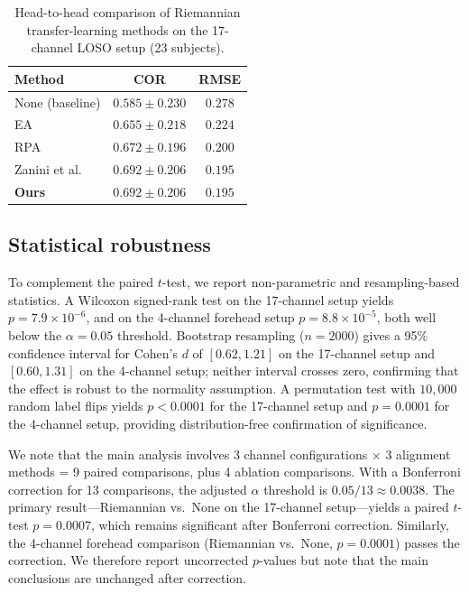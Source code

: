 \documentclass[journal,twoside,web]{ieeecolor2}
\begin{document}
\begin{table}[!t]
\caption{Head-to-head comparison of Riemannian transfer-learning
methods on the 17-channel LOSO setup (23 subjects).}
\label{tab:sota}
\centering
\setlength{\tabcolsep}{4pt}
\begin{tabular}{l c c}
\toprule
\textbf{Method} & \textbf{COR} & \textbf{RMSE} \\
\midrule
None (baseline)   & $0.585 \pm 0.230$ & $0.278$ \\
EA \cite{he2018euclidean} & $0.655 \pm 0.218$ & $0.224$ \\
RPA \cite{Rodrigues2019}  & $0.672 \pm 0.196$ & $0.200$ \\
Zanini et al.\ \cite{zanini2018} & $0.692 \pm 0.206$ & $0.195$ \\
\textbf{Ours}     & $\mathbf{0.692} \pm \mathbf{0.206}$ & $\mathbf{0.195}$ \\
\bottomrule
\end{tabular}
\end{table}

\subsection{Statistical robustness}

To complement the paired $t$-test, we report non-parametric and
resampling-based statistics. A Wilcoxon signed-rank test on the
17-channel setup yields $p = 7.9 \times 10^{-6}$, and on the
4-channel forehead setup $p = 8.8 \times 10^{-5}$, both well below
the $\alpha = 0.05$ threshold. Bootstrap resampling ($n = 2000$)
gives a 95\% confidence interval for Cohen's $d$ of $[0.62, 1.21]$
on the 17-channel setup and $[0.60, 1.31]$ on the 4-channel setup;
neither interval crosses zero, confirming that the effect is robust
to the normality assumption. A permutation test with $10{,}000$
random label flips yields $p < 0.0001$ for the 17-channel setup and
$p = 0.0001$ for the 4-channel setup, providing distribution-free
confirmation of significance.

We note that the main analysis involves 3 channel configurations
$\times$ 3 alignment methods = 9 paired comparisons, plus 4 ablation
comparisons. With a Bonferroni correction for 13 comparisons, the
adjusted $\alpha$ threshold is $0.05/13 \approx 0.0038$. The primary
result---Riemannian vs.\ None on the 17-channel setup---yields a
paired $t$-test $p = 0.0007$, which remains significant after
Bonferroni correction. Similarly, the 4-channel forehead comparison
(Riemannian vs.\ None, $p = 0.0001$) passes the correction. We
therefore report uncorrected $p$-values but note that the main
conclusions are unchanged after correction.
\end{document}
